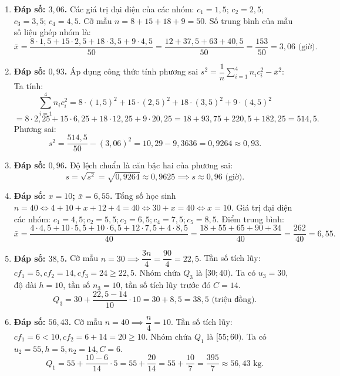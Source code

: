\documentclass[12pt,a4paper]{article}
\begin{document}
\begin{enumerate}
\item \textbf{Đáp số: $3{,}06$.}  
Các giá trị đại diện của các nhóm: $c_1 = 1{,}5$; $c_2 = 2{,}5$; $c_3 = 3{,}5$; $c_4 = 4{,}5$.  
Cỡ mẫu $n = 8 + 15 + 18 + 9 = 50$.  
Số trung bình của mẫu số liệu ghép nhóm là:  
\[
\bar{x} = \dfrac{8 \cdot 1{,}5 + 15 \cdot 2{,}5 + 18 \cdot 3{,}5 + 9 \cdot 4{,}5}{50} = \dfrac{12 + 37{,}5 + 63 + 40{,}5}{50} = \dfrac{153}{50} = 3{,}06\text{ (giờ)}.
\]

\item \textbf{Đáp số: $0{,}93$.}  
Áp dụng công thức tính phương sai $s^2 = \dfrac{1}{n}\sum\limits_{i=1}^4 n_i c_i^2 - \bar{x}^2$:  
Ta tính:  
\[
\sum_{i=1}^4 n_i c_i^2 = 8 \cdot (1{,}5)^2 + 15 \cdot (2{,}5)^2 + 18 \cdot (3{,}5)^2 + 9 \cdot (4{,}5)^2
\]
\[
= 8 \cdot 2{,}25 + 15 \cdot 6{,}25 + 18 \cdot 12{,}25 + 9 \cdot 20{,}25 = 18 + 93{,}75 + 220{,}5 + 182{,}25 = 514{,}5.
\]
Phương sai:  
\[
s^2 = \dfrac{514{,}5}{50} - (3{,}06)^2 = 10{,}29 - 9{,}3636 = 0{,}9264 \approx 0{,}93.
\]

\item \textbf{Đáp số: $0{,}96$.}  
Độ lệch chuẩn là căn bậc hai của phương sai:  
\[
s = \sqrt{s^2} = \sqrt{0{,}9264} \approx 0{,}9625 \implies s \approx 0{,}96\text{ (giờ)}.
\]

\item \textbf{Đáp số: $x = 10$; $\bar{x} = 6{,}55$.}  
Tổng số học sinh $n = 40 \iff 4 + 10 + x + 12 + 4 = 40 \iff 30 + x = 40 \iff x = 10$.  
Giá trị đại diện các nhóm: $c_1 = 4{,}5; c_2 = 5{,}5; c_3 = 6{,}5; c_4 = 7{,}5; c_5 = 8{,}5$.  
Điểm trung bình:  
\[
\bar{x} = \dfrac{4 \cdot 4{,}5 + 10 \cdot 5{,}5 + 10 \cdot 6{,}5 + 12 \cdot 7{,}5 + 4 \cdot 8{,}5}{40} = \dfrac{18 + 55 + 65 + 90 + 34}{40} = \dfrac{262}{40} = 6{,}55.
\]

\item \textbf{Đáp số: $38{,}5$.}  
Cỡ mẫu $n = 30 \implies \dfrac{3n}{4} = \dfrac{90}{4} = 22{,}5$.  
Tần số tích lũy: $cf_1 = 5, cf_2 = 14, cf_3 = 24 \ge 22{,}5$.  
Nhóm chứa $Q_3$ là $[30; 40)$. Ta có $u_3 = 30$, độ dài $h = 10$, tần số $n_3 = 10$, tần số tích lũy trước đó $C = 14$.  
\[
Q_3 = 30 + \dfrac{22{,}5 - 14}{10} \cdot 10 = 30 + 8{,}5 = 38{,}5\text{ (triệu đồng)}.
\]

\item \textbf{Đáp số: $56{,}43$.}  
Cỡ mẫu $n = 40 \implies \dfrac{n}{4} = 10$.  
Tần số tích lũy: $cf_1 = 6 < 10, cf_2 = 6 + 14 = 20 \ge 10$.  
Nhóm chứa $Q_1$ là $[55; 60)$. Ta có $u_2 = 55, h = 5, n_2 = 14, C = 6$.  
\[
Q_1 = 55 + \dfrac{10 - 6}{14} \cdot 5 = 55 + \dfrac{20}{14} = 55 + \dfrac{10}{7} = \dfrac{395}{7} \approx 56{,}43\text{ kg}.
\]


\end{enumerate}
\end{document}
